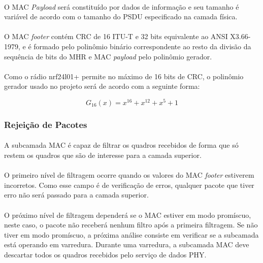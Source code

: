 \paragraph{} O MAC \textit{Payload} será constituído por dados de informação e seu tamanho é variável de acordo com o tamanho do PSDU especificado na camada física.

\paragraph{} O MAC \textit{footer} contém CRC de 16 ITU-T e 32 bits equivalente ao ANSI X3.66-1979, e é formado pelo polinômio binário correspondente ao resto da divisão da sequência de bits do MHR e MAC \textit{payload} pelo polinômio gerador.

\paragraph{} Como o rádio nrf24l01+ permite no máximo de 16 bits de CRC, o polinômio gerador usado no projeto será de acordo com a seguinte forma:

\begin{equation}
    G_{16}(x) = x^{16} + x^{12} + x^5 + 1 
\end{equation}

\subsubsection{Rejeição de Pacotes}
\paragraph{} A subcamada MAC é capaz de filtrar os quadros recebidos de forma que só restem os quadros que são de interesse para a camada superior.

\paragraph{} O primeiro nível de filtragem ocorre quando os valores do MAC \textit{footer} estiverem incorretos. Como esse campo é de verificação de erros, qualquer pacote que tiver erro não será passado para a camada superior.

\paragraph{} O próximo nível de filtragem dependerá se o MAC estiver em modo promíscuo, neste caso, o pacote não receberá nenhum filtro após a primeira filtragem. Se não tiver em modo promíscuo, a próxima análise consiste em verificar se a subcamada está operando em varredura. Durante uma varredura, a subcamada MAC deve descartar todos os quadros recebidos pelo serviço de dados PHY.

